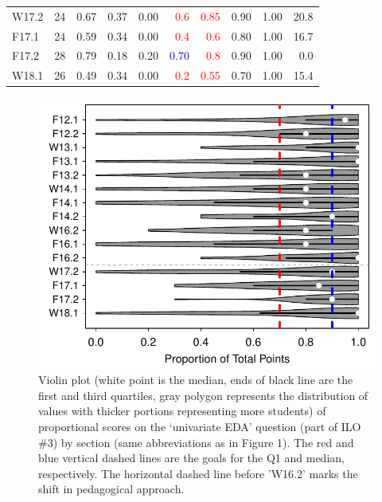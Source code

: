 \documentclass{article}\usepackage[]{graphicx}\usepackage[]{color}
\newenvironment{knitrout}{}{} %
\begin{document}
\begin{table}[h]
\begin{tabular}{lrrrrrrrrr}
  W17.2 & 24 & 0.67 & 0.37 & 0.00 & \textcolor{red}{                    0.6} & \textcolor{red}{                   0.85} & 0.90 & 1.00 & 20.8 \\ 
  F17.1 & 24 & 0.59 & 0.34 & 0.00 & \textcolor{red}{                    0.4} & \textcolor{red}{                    0.6} & 0.80 & 1.00 & 16.7 \\ 
  F17.2 & 28 & 0.79 & 0.18 & 0.20 & \textcolor{red}{\textcolor{blue}{0.70}} & \textcolor{red}{                    0.8} & 0.90 & 1.00 & 0.0 \\ 
  W18.1 & 26 & 0.49 & 0.34 & 0.00 & \textcolor{red}{                    0.2} & \textcolor{red}{                   0.55} & 0.70 & 1.00 & 15.4 \\ 
   \hline
\end{tabular}
\end{table}


\begin{knitrout}
\color{fgcolor}\begin{figure}[h]

{\centering \includegraphics[width=.6\linewidth]{Figs/UEDAQBar-1} 

}

\caption[Violin plot (white point is the median, ends of black line are the first and third quartiles, gray polygon represents the distribution of values with thicker portions representing more students) of proportional scores on the `univariate EDA' question (part of ILO \#3) by section (same abbreviations as in Figure 1)]{Violin plot (white point is the median, ends of black line are the first and third quartiles, gray polygon represents the distribution of values with thicker portions representing more students) of proportional scores on the `univariate EDA' question (part of ILO \#3) by section (same abbreviations as in Figure 1). The red and blue vertical dashed lines are the goals for the Q1 and median, respectively. The horizontal dashed line before 'W16.2' marks the shift in pedagogical approach.}\label{fig:UEDAQBar}
\end{figure}


\end{knitrout}
\end{document}
